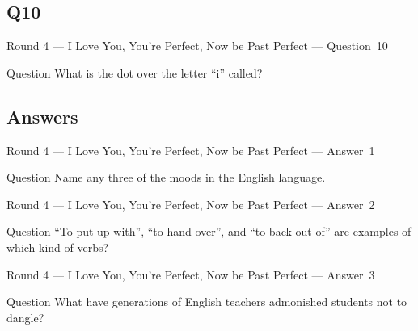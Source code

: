 \documentclass[11pt]{beamer}
\begin{document}
\subsection*{Q10}
\begin{frame}[t]{Round 4 --- I Love You, You're Perfect, Now be Past Perfect --- \mbox{Question 10}}
\vspace{-0.5em}
\begin{block}{Question}
What is the dot over the letter ``i'' called?
\end{block}
\end{frame}
\subsection{Answers}
\begin{frame}[t]{Round 4 --- I Love You, You're Perfect, Now be Past Perfect --- \mbox{Answer 1}}
\vspace{-0.5em}
\begin{block}{Question}
Name any three of the moods in the English language.
\end{block}
\end{frame}
\begin{frame}[t]{Round 4 --- I Love You, You're Perfect, Now be Past Perfect --- \mbox{Answer 2}}
\vspace{-0.5em}
\begin{block}{Question}
``To put up with'', ``to hand over'', and ``to back out of'' are examples of which kind of verbs? 
\end{block}
\end{frame}
\begin{frame}[t]{Round 4 --- I Love You, You're Perfect, Now be Past Perfect --- \mbox{Answer 3}}
\vspace{-0.5em}
\begin{block}{Question}
What have generations of English teachers admonished students not to dangle?
\end{block}
\end{frame}
\end{document}
